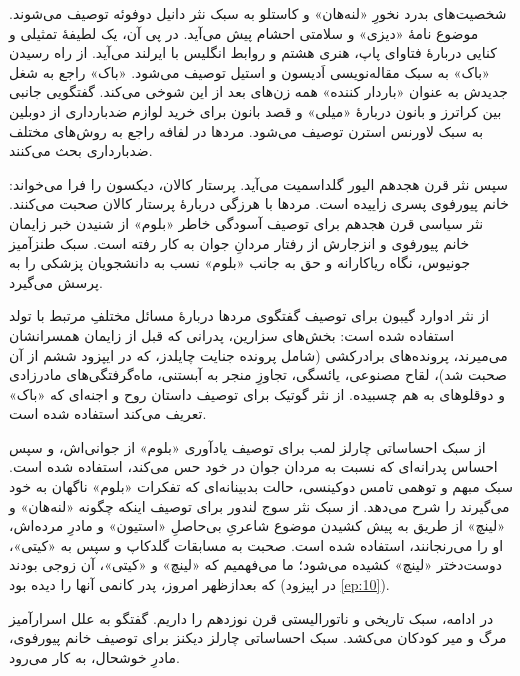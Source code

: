 \documentclass[12pt]{book}
\newcommand{\noun}[1]{«{#1}»}
\begin{document}
    شخصیت‌های بدرد نخورِ \noun{لنه‌هان} و کاستلو به سبک نثر دانیل دوفوئه توصیف می‌شوند. موضوع نامۀ \noun{دیزی} و سلامتی احشام پیش می‌آید. در پی آن، یک لطیفۀ تمثیلی و کنایی دربارۀ فتاوای پاپ، هنری هشتم و روابط انگلیس با ایرلند می‌آید. از راه رسیدن \noun{باک}  به سبک مقاله‌نویسی اَدیسون و استیل توصیف می‌شود. \noun{باک}  راجع به شغل جدیدش به عنوان «باردار کننده» همه زن‌های بعد از این شوخی می‌کند. گفتگویی جانبی بین کراترز و بانون دربارۀ \noun{میلی} و قصد بانون برای خرید لوازم ضدبارداری از دوبلین به سبک لاورنس استرن توصیف می‌شود. مردها در لفافه راجع به روش‌های مختلف ضدبارداری بحث می‌کنند.

    سپس نثر قرن هجدهم الیور گلداسمیت می‌آید. پرستار کالان، دیکسون را فرا می‌خواند: خانم پیورفوی پسری زاییده است. مردها با هرزگی دربارۀ پرستار کالان صحبت می‌کنند. نثر سیاسی قرن هجدهم برای توصیف آسودگی خاطر \noun{بلوم} از شنیدن خبر زایمان خانم پیورفوی و انزجارش از رفتار مردانِ جوان به کار رفته است. سبک طنزآمیز جونیوس، نگاه ریاکارانه و حق به جانب \noun{بلوم} نسب به دانشجویان پزشکی را به پرسش می‌گیرد.

    از نثر ادوارد گیبون برای توصیف گفتگوی مردها دربارۀ مسائل مختلفِ مرتبط با تولد استفاده شده است: بخش‌های سزارین، پدرانی که قبل از زایمان همسرانشان می‌میرند، پرونده‌های برادرکشی (شامل پرونده جنایت چایلدز، که در ایپزود ششم از آن صحبت شد)، لقاح مصنوعی، یائسگی، تجاوزِ منجر به آبستنی، ماه‌گرفتگی‌های مادرزادی و دوقلوهای به هم چسبیده. از نثر گوتیک برای توصیف داستان روح و اجنه‌ای که \noun{باک}  تعریف می‌کند استفاده شده است.

    از سبک احساساتی چارلز لمب برای توصیف یادآوری \noun{بلوم} از جوانی‌اش، و سپس احساس پدرانه‌ای که نسبت به مردان جوان در خود حس می‌کند، استفاده شده است. سبک مبهم و توهمی تامس دوکینسی، حالت بدبینانه‌ای که تفکرات \noun{بلوم} ناگهان به خود می‌گیرند را شرح می‌دهد. از سبک نثر سوج لندور برای توصیف اینکه چگونه \noun{لنه‌هان} و \noun{لینچ} از طریق به پیش کشیدن موضوع شاعریِ بی‌حاصلِ \noun{استیون} و مادرِ مرده‌اش، او را می‌رنجانند، استفاده شده است. صحبت به مسابقات گلدکاپ و سپس به \noun{کیتی}، دوست‌دختر \noun{لینچ} کشیده می‌شود؛ ما می‌فهمیم که \noun{لینچ} و \noun{کیتی}، آن زوجی بودند که بعدازظهر امروز، پدر کانمی آنها را دیده بود (در اپیزود \ref{ep:10}).

    در ادامه، سبک تاریخی و ناتورالیستی قرن نوزدهم را داریم. گفتگو به علل اسرارآمیز مرگ و میر کودکان می‌کشد. سبک احساساتی چارلز دیکنز برای توصیف خانم پیورفوی، مادرِ خوشحال، به کار می‌رود.
\end{document}
